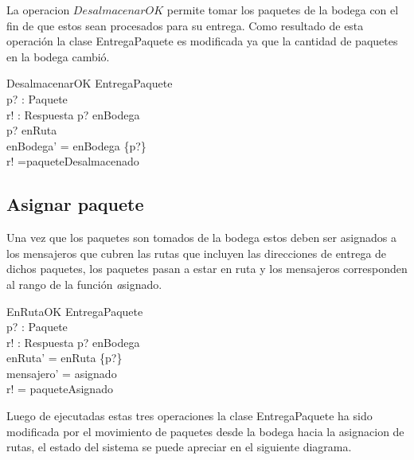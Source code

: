 \documentclass[12pt,a4paper]{article}
\begin{document}
La operacion $DesalmacenarOK$ permite tomar los paquetes de la bodega con el fin de que estos sean procesados para su entrega. Como resultado de esta operación la clase EntregaPaquete es modificada ya que la cantidad de paquetes en la bodega cambió.

\begin{schema}{DesalmacenarOK}
\Delta EntregaPaquete\\
p? : Paquete\\
r! : Respuesta
\where
p? \in enBodega\\
p? \notin  enRuta\\
enBodega' = enBodega \setminus \{p?\}\\
r! =paqueteDesalmacenado
\end{schema}

\subsection{Asignar paquete}

Una vez que los paquetes son tomados de la bodega estos deben ser asignados a los mensajeros que cubren las rutas que incluyen las direcciones de entrega de dichos paquetes, los paquetes pasan a estar en ruta y los mensajeros corresponden al rango de la función \textit asignado. 

\begin{schema}{EnRutaOK}
\Delta EntregaPaquete\\
p? : Paquete\\
r! : Respuesta
\where
p? \notin  enBodega\\
enRuta' = enRuta \cup \{p?\}\\
mensajero' = \ran asignado\\
r! = paqueteAsignado
\end{schema}

Luego de ejecutadas estas tres operaciones la clase EntregaPaquete ha sido modificada por el movimiento de paquetes desde la bodega hacia la asignacion de rutas, el estado del sistema se puede apreciar en el siguiente diagrama.

\begin{center}
\end{center}
\end{document}
